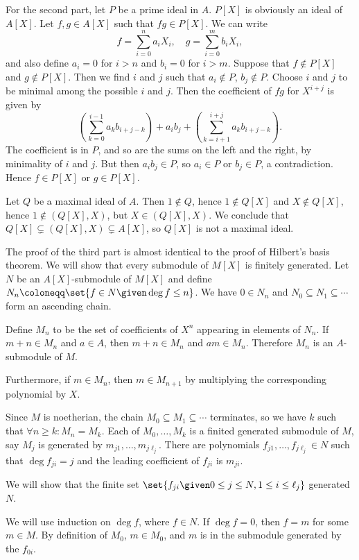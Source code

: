 For the second part, let $P$ be a prime ideal in $A$. $P[X]$ is obviously
an ideal of $A[X]$. Let $f, g \in A[X]$ such that $fg \in P[X]$. We can write
\[ f = \sum_{i = 0}^n a_iX_i,\quad g = \sum_{i = 0}^m b_iX_i, \]
and also define $a_i = 0$ for $i > n$ and $b_i = 0$ for $i > m$. Suppose
that $f\notin P[X]$ and $g\notin P[X]$. Then we find $i$ and $j$ such that
$a_i \notin P$, $b_j \notin P$. Choose $i$ and $j$ to be minimal among the possible
$i$ and $j$. Then the coefficient of $fg$ for $X^{i+j}$
is given by
\[ \left(\sum_{k = 0}^{i - 1}a_kb_{i + j - k}\right) + a_ib_j + \left(\sum_{k = i + 1}^{i + j}a_k b_{i+j-k}\right). \]
The coefficient is in $P$, and so are the sums on the left and the right, by minimality
of $i$ and $j$. But then $a_ib_j \in P$, so $a_i \in P$ or $b_j \in P$, a contradiction.
Hence $f \in P[X]$ or $g \in P[X]$.

Let $Q$ be a maximal ideal of $A$. Then $1 \notin Q$, hence $1\notin Q[X]$ and $X\notin Q[X]$,
hence $1 \notin (Q[X], X)$, but $X \in (Q[X], X)$. We conclude that
$Q[X] \subsetneq (Q[X], X) \subsetneq A[X]$, so $Q[X]$ is not a maximal ideal.

The proof of the third part is almost identical to the proof of Hilbert's basis
theorem. We will show that every submodule of $M[X]$ is finitely generated.
Let $N$ be an $A[X]$-submodule of $M[X]$ and define
$N_n\coloneqq\set{f \in N\given \deg f\leq n}$. We have $0 \in N_n$ and
$N_0 \subseteq N_1 \subseteq \cdots$ form an ascending chain.

Define $M_n$ to be the set of coefficients of $X^n$ appearing in elements
of $N_n$. If $m+n \in M_n$ and $a \in A$, then $m+n \in M_n$ and $am \in M_n$.
Therefore $M_n$ is an $A$-submodule of $M$.

Furthermore, if $m \in M_n$, then $m \in M_{n+1}$ by multiplying the corresponding
polynomial by $X$.

Since $M$ is noetherian, the chain $M_0 \subseteq M_1 \subseteq \cdots$ terminates,
so we have $k$ such that $\forall n\geq k\colon M_n = M_k$. Each of
$M_0, \ldots, M_k$ is a finited generated submodule of $M$, say
$M_j$ is generated by $m_{j1}, \ldots, m_{j\ell_j}$. There are polynomials
$f_{j1}, \ldots, f_{j\ell_j} \in N$ such that $\deg f_{ji} = j$ and the
leading coefficient of $f_{ji}$ is $m_{ji}$.

We will show that the finite set $\set{f_{ji}\given 0\leq j\leq N, 1\leq i\leq \ell_j}$
generated $N$.

We will use induction on $\deg f$, where $f \in N$. If $\deg f = 0$, then $f = m$
for some $m \in M$. By definition of $M_0$, $m \in M_0$, and $m$ is in the
submodule generated by the $f_{0i}$.

